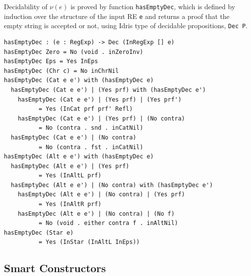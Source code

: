 \documentclass{llncs}
\newcommand{\idris}[1]{\texttt{#1}}%
\begin{document}
Decidability of $\nu(e)$ is proved by function \idris{hasEmptyDec},
which is defined by induction over the structure of the input RE
\idris{e} and returns a proof that the empty string is accepted or
not, using Idris type of decidable propositions, \idris{Dec P}.
\begin{verbatim}
hasEmptyDec : (e : RegExp) -> Dec (InRegExp [] e)
hasEmptyDec Zero = No (void . inZeroInv)
hasEmptyDec Eps = Yes InEps
hasEmptyDec (Chr c) = No inChrNil
hasEmptyDec (Cat e e') with (hasEmptyDec e)
  hasEmptyDec (Cat e e') | (Yes prf) with (hasEmptyDec e')
    hasEmptyDec (Cat e e') | (Yes prf) | (Yes prf')
          = Yes (InCat prf prf' Refl)
    hasEmptyDec (Cat e e') | (Yes prf) | (No contra)
          = No (contra . snd . inCatNil)
  hasEmptyDec (Cat e e') | (No contra)
          = No (contra . fst . inCatNil)
hasEmptyDec (Alt e e') with (hasEmptyDec e)
  hasEmptyDec (Alt e e') | (Yes prf)
          = Yes (InAltL prf)
  hasEmptyDec (Alt e e') | (No contra) with (hasEmptyDec e')
    hasEmptyDec (Alt e e') | (No contra) | (Yes prf)
          = Yes (InAltR prf)
    hasEmptyDec (Alt e e') | (No contra) | (No f)
          = No (void . either contra f . inAltNil)
hasEmptyDec (Star e)
          = Yes (InStar (InAltL InEps))
\end{verbatim}

\subsection{Smart Constructors}\label{sec:smart}
\end{document}
